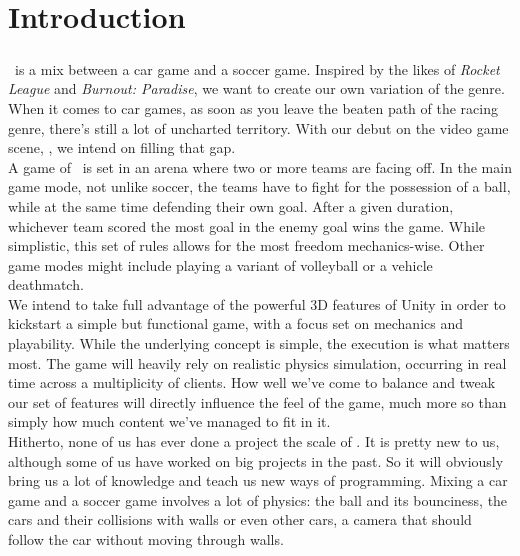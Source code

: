 \tableofcontents

\chapter{Introduction}

\paragraph{}\FR~is a mix between a car game and a soccer game. Inspired by the likes of \emph{Rocket League} and \emph{Burnout: Paradise}, we want to create our own variation of the genre. When it comes to car games, as soon as you leave the beaten path of the racing genre, there’s still a lot of uncharted territory. With our debut on the video game scene, \FR, we intend on filling that gap.\\


A game of \FR~is set in an arena where two or more teams are facing off. In the main game mode, not unlike soccer, the teams have to fight for the possession of a ball, while at the same time defending their own goal. After a given duration, whichever team scored the most goal in the enemy goal wins the game. While simplistic, this set of rules allows for the most freedom mechanics-wise. Other game modes might include playing a variant of volleyball or a vehicle deathmatch.\\


We intend to take full advantage of the powerful 3D features of Unity in order to kickstart a simple but functional game, with a focus set on mechanics and playability. While the underlying concept is simple, the execution is what matters most. The game will heavily rely on realistic physics simulation, occurring in real time across a multiplicity of clients. How well we've come to balance and tweak our set of features will directly influence the feel of the game, much more so than simply how much content we've managed to fit in it.\\


Hitherto, none of us has ever done a project the scale of \FR. It is pretty new to us, although some of us have worked on big projects in the past. So it will obviously bring us a lot of knowledge and teach us new ways of programming. Mixing a car game and a soccer game involves a lot of physics: the ball and its bounciness, the cars and their collisions with walls or even other cars, a camera that should follow the car without moving through walls.\\


